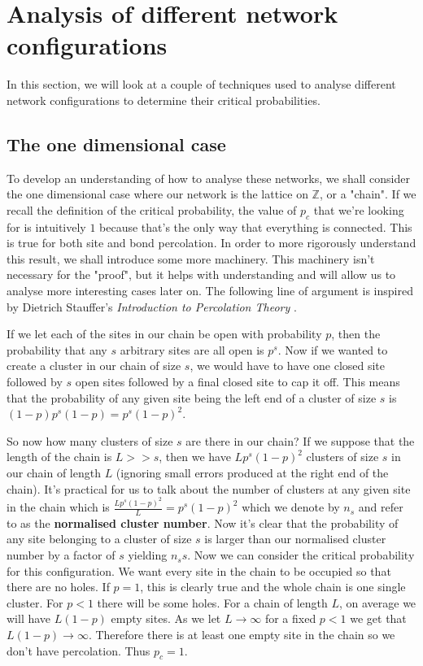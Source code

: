 \section{Analysis of different network configurations}
In this section, we will look at a couple of techniques used to analyse different network configurations to determine their critical probabilities.

\subsection{The one dimensional case}
To develop an understanding of how to analyse these networks, we shall consider the one dimensional case where our network is the lattice on $\mathbb{Z}$, or a "chain".
If we recall the definition of the critical probability, the value of $p_c$ that we're looking for is intuitively $1$ because that's the only way that everything is connected. This
is true for both site and bond percolation. In
order to more rigorously understand this result, we shall introduce some more
machinery. This machinery isn't necessary for the "proof", but it helps with understanding and will allow us to analyse more interesting cases later on. The following line of
argument is inspired by Dietrich Stauffer's \textit{Introduction to Percolation Theory} \cite{Stauffer}.

If we let each of the sites in our chain be open with probability $p$, then the probability that any $s$ arbitrary sites are all open is $p^s$. Now if we wanted to create a cluster
in our chain of size $s$, we would have to have one closed site followed by $s$ open sites followed by a final closed site to cap it off. This means that the probability of any
given site being the left end of a cluster of size $s$ is $(1-p)p^s(1-p) = p^s(1-p)^2$.

So now how many clusters of size $s$ are there in our chain? If we suppose that the length of the chain is $L >> s$, then we have $Lp^s(1-p)^2$ clusters of size $s$ in our chain of
length $L$ (ignoring small errors produced at the right end of the chain). It's practical for us to talk about the number of clusters at any given site in the chain which is
$\frac{Lp^s(1-p)^2}{L} = p^s(1-p)^2$ which we denote by $n_s$ and refer to as the \textbf{normalised cluster number}. Now it's clear that the probability of any site belonging to a
cluster of size $s$ is larger than our normalised cluster number by a factor of $s$ yielding $n_ss$. Now we can consider the critical probability for this configuration. We want
every site in the chain to be occupied so that there are no holes. If $p = 1$, this is clearly true and the whole chain is one single cluster. For $p < 1$ there will be some holes.
For a chain of length $L$, on average we will have $L(1-p)$ empty sites. As we let $L \rightarrow \infty$ for a fixed $p < 1$ we get that $L(1-p) \rightarrow \infty$. Therefore
there is at least one empty site in the chain so we don't have percolation. Thus $p_c = 1$.

